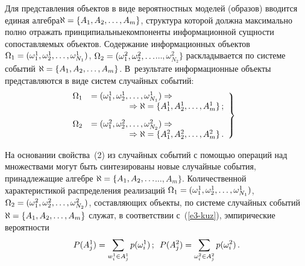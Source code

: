 \begin{multicols}{2}
  Для представления объектов в виде вероятностных моделей (образов)
вводится единая алгебра\linebreak $\aleph\hm= \{A_1, A_2, \ldots , A_m\}$, структура
которой должна максимально полно отражать принципиальные\linebreak компоненты
информационной сущности со\-по\-став\-ля\-емых объектов. Содержание
информационных объектов $\Omega_1\hm= (\omega_1^1, \omega_2^1,
\ldots , \omega^1_{N_1})$, $\Omega_2\hm= (\omega_1^2,
\omega_2^2,  \ldots$\linebreak $\ldots , \omega^2_{N_2}\}$ раскладывается по системе
событий $\aleph \hm= \{ A_1, A_2, \ldots , A_m\}$. В~результате информационные
объекты представляются в виде систем случайных событий:
  \begin{equation}
  \label{e8-kuz}
\left.
\begin{array}{rl}
\hspace*{-10mm}\Omega_1&= (\omega_1^1, \omega_2^1,\ldots , \omega^1_{N_1})
\Rightarrow{}\\
&\hspace*{15mm}{}\Rightarrow \aleph = \{ A_1^1, A_2^1, \ldots , A_m^1\}\,; %
\\[9pt]
  \hspace*{-10mm}\Omega_2&= (\omega_1^2, \omega_2^2,\ldots , \omega^2_{N_2})
\Rightarrow {}\\
&\hspace*{15mm}{}\Rightarrow\aleph = \{ A_1^2, A_2^2, \ldots , A_m^2\}\,. %
\end{array}
\right\}
\end{equation}

  На основании свойства~(2) из случайных событий с помощью операций над
множествами могут быть синтезированы новые случайные события,
принадлежащие алгебре $\aleph \hm= \{A_1, A_2, \ldots$\linebreak $\ldots , A_m\}$.  Количественной
характеристикой распределения реализаций $\Omega_1\hm= (\omega_1^1,
\omega_2^1, \ldots  , \omega^1_{N_1})$, $\Omega_2\hm=
(\omega_1^2, \omega_2^2, \ldots , \omega^2_{N_2})$, составляющих
объекты, по системе случайных событий $\aleph\hm=\{A_1, A_2, \ldots , A_m\}$
служат, в соответствии с~(\ref{e3-kuz}), эмпирические вероятности
  \begin{equation}
  P(A_j^1) =\sum\limits_{w_i^1\in A_j^1} p(\omega_i^1)\,;\enskip  P(A_j^2)
=\sum\limits_{\omega^2_i\in A_j^2} p(\omega_i^2)\,.
  \label{e9-kuz}
  \end{equation}


\end{multicols}
